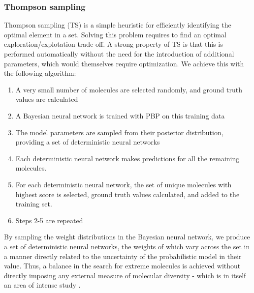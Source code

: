 \subsubsection{Thompson sampling}

Thompson sampling (TS) \cite{Thompson_1933} is a simple heuristic for efficiently identifying the optimal element in a set. Solving this problem requires to find an optimal exploration/explotation trade-off. A strong property of TS  is that this is performed automatically without the need for the introduction of additional parameters, which would themselves require optimization.
We achieve this with the following algorithm:
\begin{enumerate}
\item A very small number of molecules are selected randomly, and ground truth values are calculated
\item A Bayesian neural network is trained with PBP on this training data
\item The model parameters are sampled from their posterior distribution, providing a set of deterministic neural networks
\item Each deterministic neural network makes predictions for all the remaining molecules.
\item For each deterministic neural network, the set of unique molecules with highest score is selected,  ground truth values calculated, and added to the training set.
\item Steps 2-5 are repeated
\end{enumerate}
By sampling the weight distributions in the Bayesian neural network, we produce a set of deterministic neural networks, the weights of which vary across the set in a manner directly related to the uncertainty of the probabilistic model in their value.  Thus, a balance in the search for extreme molecules is achieved without directly imposing any external measure of molecular diversity - which is in itself an area of intense study \cite{Maldonado_2006}.